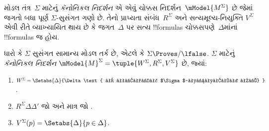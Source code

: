 \documentclass[../../../include/open-logic-section]{subfiles}
\begin{document}


મોડલ તંત્ર~$\Sigma$ માટેનું \emph{કૅનોનિકલ નિદર્શન} એ એવું ચોક્કસ
નિદર્શન~$\mModel{M^\Sigma}$ છે જેમાં જગતો બધા પૂર્ણ
$\Sigma$-સુસંગત ગણો છે. તેનો પ્રાપ્યતા સંબંધ~$R^\Sigma$ અને
સત્યમૂલ્ય-નિયુક્તિ $V^\Sigma$ એવી રીતે વ્યાખ્યાયિત થાય છે કે
જગત~$\Delta$ પર સત્ય !!{formula}s ચોક્કસપણે~$\Delta$માંનાં
!!{formula}s જ હોય.

\begin{defn}
  ધારો કે $\Sigma$ સુસંગત સામાન્ય મોડલ તર્ક છે, એટલે કે
  $\Sigma \Proves/ \lfalse$. $\Sigma$ માટેનું
  \emph{કૅનોનિકલ નિદર્શન} $\mModel{M}^\Sigma =
  \tuple{W^\Sigma, R^\Sigma, V^\Sigma}$ છે, જ્યાં:
  \begin{enumerate}
  \item $W^\Sigma = \Setabs{ \Delta }{\Delta \text{
      એ પૂર્ણ $\Sigma$-સુસંગત છે} }$.
  \item $R^\Sigma \Delta\Delta'$ જો અને માત્ર જો
    .
  \item $V^\Sigma(p) = \Setabs{\Delta}{p \in \Delta}$.
  \end{enumerate}
\end{defn}

\end{document}
